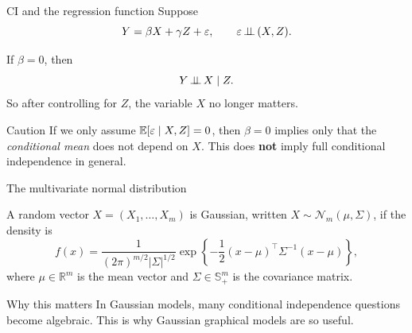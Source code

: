 \documentclass[dvipsnames,aspectratio=169,handout]{beamer}
\begin{document}
\begin{frame}{CI and the regression function}
Suppose
\[
Y=\beta X+\gamma Z+\varepsilon,
\qquad \varepsilon\mbox{\,$\perp\!\!\!\perp$\,} (X,Z).
\]
\vspace{-5mm}
\begin{block}{}
If $\beta=0$, then
\[
Y\mbox{\,$\perp\!\!\!\perp$\,} X\mid Z.
\]
So after controlling for $Z$, the variable $X$ no longer matters.
\end{block}

\begin{alertblock}{Caution}
If we only assume $\mathbb{E}[\varepsilon\mid X,Z]=0$, then $\beta=0$ implies only that the \emph{conditional mean} does not depend on $X$.
This does \textbf{not} imply full conditional independence in general.
\end{alertblock}
\end{frame}

\begin{frame}{The multivariate normal distribution}

\begin{block}{}
A random vector $X=(X_1,\ldots,X_m)$ is Gaussian, written
$
X\sim \mathcal N_m(\mu,\Sigma)$, if the density is\[
f(x)=\frac{1}{(2\pi)^{m/2}|\Sigma|^{1/2}}
\exp\left\{-\frac12 (x-\mu)^\top\Sigma^{-1}(x-\mu)\right\},
\]
where $\mu\in\mathbb R^m$ is the mean vector and  $\Sigma\in\mathbb S_+^m$ is the covariance matrix.
\end{block}

\begin{alertblock}{Why this matters}
In Gaussian models, many conditional independence questions become algebraic.
This is why Gaussian graphical models are so useful.
\end{alertblock}
\end{frame}
\end{document}
